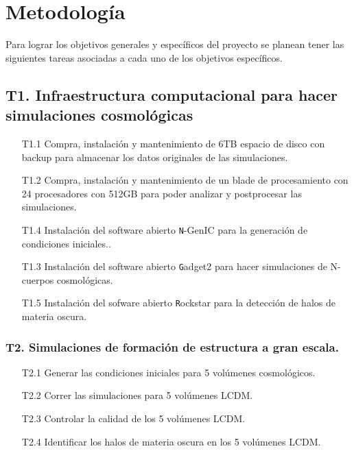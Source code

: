 
\section{Metodolog\'ia}

Para lograr los objetivos generales y espec\'ificos del proyecto se
planean tener las siguientes tareas asociadas a cada uno de los
objetivos espec\'ificos. 

\subsection*{T1. Infraestructura computacional para hacer simulaciones
  cosmol\'ogicas} 
\begin{itemize}
\item[T1.1] Compra, instalaci\'on y mantenimiento de 6TB espacio de disco
  con backup para almacenar los datos originales de las simulaciones.
\item[T1.2] Compra, instalaci\'on y mantenimiento de un blade de
  procesamiento con 24 procesadores con 512GB para poder analizar y
  postprocesar las simulaciones.
\item[T1.4] Instalaci\'on del software abierto {\texttt N-GenIC} para
  la generaci\'on de condiciones iniciales..
\item[T1.3] Instalaci\'on del software abierto {\texttt Gadget2} para
  hacer simulaciones de N-cuerpos cosmol\'ogicas.
\item[T1.5] Instalaci\'on del sofware abierto {\texttt Rockstar} para
  la detecci\'on de halos de materia oscura.
\end{itemize}

\subsubsection*{T2. Simulaciones de formaci\'on de estructura a gran escala.}

\begin{itemize}
\item[T2.1] Generar las condiciones iniciales para 5 vol\'umenes
  cosmol\'ogicos. 
\item[T2.2] Correr las simulaciones para 5 vol\'umenes LCDM.
\item[T2.3] Controlar la calidad de los 5 vol\'umenes LCDM.
\item[T2.4] Identificar los halos de materia oscura en los 5
  vol\'umenes LCDM.
\end{itemize}

